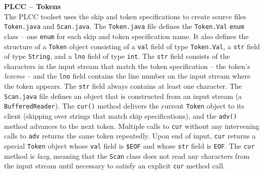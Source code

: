 \begin{minipage}[t]{\sw}
\slidenumber
\LARGE
{\bf PLCC -- Tokens}\\
The PLCC toolset uses the skip and token specifications
to create source files \verb'Token.java' and \verb'Scan.java'.\exx
The \verb'Token.java' file defines the \verb'Token.Val' \verb'enum' class --
one \verb'enum' for each skip and token specification name.
It also defines the structure of a \verb'Token' object
consisting of a \verb'val' field of type \verb'Token.Val',
a \verb'str' field of type \verb'String',
and a \verb'lno' field of type \verb'int'.
The \verb'str' field consists of the characters in the input stream
that match the token specification -- the token's {\em lexeme} --
and the \verb'lno' field contains the line number on the input stream
where the token appears.
The \verb'str' field always contains at least one character.\exx
The \verb'Scan.java' file defines an object
that is constructed from an input stream (a \verb'BufferedReader').
The \verb'cur()' method delivers the current \verb'Token' object to its client
(skipping over strings that match skip specifications),
and the \verb'adv()' method advances to the next token.
Multiple calls to \verb'cur' without any intervening calls to \verb'adv'
returns the same token repeatedly.\exx
Upon end of input, \verb'cur' returns a special \verb'Token' object
whose \verb'val' field is \verb'$EOF'
and whose \verb'str' field is \verb'EOF'.\exx
The \verb'cur' method is {\em lazy},
meaning that the \verb'Scan' class does not read any characters
from the input stream until necessary
to satisfy an explicit \verb'cur' method call.
\end{minipage}
\clearpage
